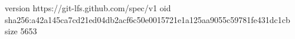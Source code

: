 version https://git-lfs.github.com/spec/v1
oid sha256:a42a145ca7cd21ed04db2acf6c50e0015721e1a125aa9055c59781fe431dc1cb
size 5653
